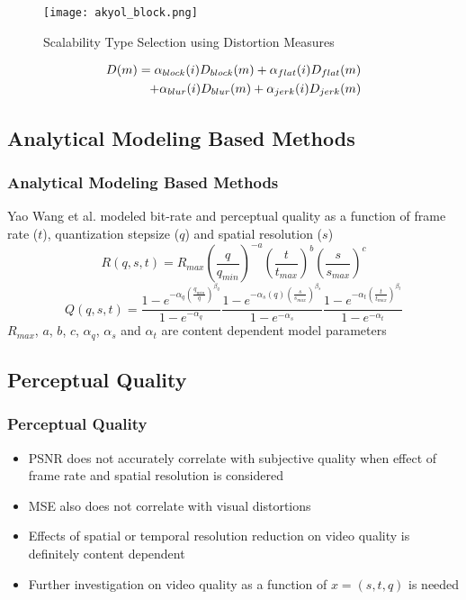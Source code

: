\documentclass{beamer}
\begin{document}
\begin{frame}\frametitle{}
\begin{figure}
\centering
\texttt{[image: akyol\_block.png]}
\caption{Scalability Type Selection using Distortion Measures }
\label{akyol_block}
\end{figure}
\vspace{-3 mm}
\begin{align}
D(m) = \alpha_{block}(i)D_{block}(m)+\alpha_{flat}(i)D_{flat}(m) \\ \notag
+\alpha_{blur}(i)D_{blur}(m)+\alpha_{jerk}(i)D_{jerk}(m)
\end{align}
\end{frame}

\subsection{Analytical Modeling Based Methods}
\begin{frame}\frametitle{Analytical Modeling Based Methods}
Yao Wang et al. modeled bit-rate and perceptual quality as a function of frame rate ($t$), quantization stepsize ($q$) and spatial resolution ($s$)
\begin{equation}
R(q,s,t) = R_{max} \left(\frac{q}{q_{min}}\right)^{-a} \left(\frac{t}{t_{max}}\right)^{b} \left(\frac{s}{s_{max}}\right)^{c}
\end{equation}
\begin{equation}
Q(q,s,t) = \frac{1-e^{-\alpha_q\left(\frac{q_{min}}{q}\right)^{\beta_q}}}{1-e^{-\alpha_q}}
\frac{1-e^{-\alpha_s(q)\left(\frac{s}{s_{max}}\right)^{\beta_s}}}{1-e^{-\alpha_s}}
\frac{1-e^{-\alpha_t\left(\frac{t}{t_{max}}\right)^{\beta_t}}}{1-e^{-\alpha_t}}
\end{equation}
$R_{max}$, $a$, $b$, $c$, $\alpha_q$, $\alpha_s$ and $\alpha_t$ are content dependent model parameters
\end{frame}

\subsection{Perceptual Quality}
\begin{frame}\frametitle{Perceptual Quality}
\begin{itemize}
\setlength\itemsep{1 em}
\item PSNR does not accurately correlate with subjective quality when effect of frame rate and spatial resolution is considered
\item MSE also does not correlate with visual distortions
\item Effects of spatial or temporal resolution reduction on video quality is definitely content dependent
\item Further investigation on video quality as a function of $x = (s,t,q)$ is needed
\end{itemize}
\end{frame}
\end{document}
